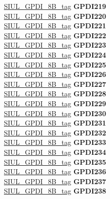 \begin{DoxyCompactItemize}
\begin{tabbing}
\>\>\mbox{\hyperlink{unionSIUL__GPDI__8B__tag}{SIUL\_GPDI\_8B\_tag}} {\bfseries GPDI219}\\
\>\>\mbox{\hyperlink{unionSIUL__GPDI__8B__tag}{SIUL\_GPDI\_8B\_tag}} {\bfseries GPDI220}\\
\>\>\mbox{\hyperlink{unionSIUL__GPDI__8B__tag}{SIUL\_GPDI\_8B\_tag}} {\bfseries GPDI221}\\
\>\>\mbox{\hyperlink{unionSIUL__GPDI__8B__tag}{SIUL\_GPDI\_8B\_tag}} {\bfseries GPDI222}\\
\>\>\mbox{\hyperlink{unionSIUL__GPDI__8B__tag}{SIUL\_GPDI\_8B\_tag}} {\bfseries GPDI223}\\
\>\>\mbox{\hyperlink{unionSIUL__GPDI__8B__tag}{SIUL\_GPDI\_8B\_tag}} {\bfseries GPDI224}\\
\>\>\mbox{\hyperlink{unionSIUL__GPDI__8B__tag}{SIUL\_GPDI\_8B\_tag}} {\bfseries GPDI225}\\
\>\>\mbox{\hyperlink{unionSIUL__GPDI__8B__tag}{SIUL\_GPDI\_8B\_tag}} {\bfseries GPDI226}\\
\>\>\mbox{\hyperlink{unionSIUL__GPDI__8B__tag}{SIUL\_GPDI\_8B\_tag}} {\bfseries GPDI227}\\
\>\>\mbox{\hyperlink{unionSIUL__GPDI__8B__tag}{SIUL\_GPDI\_8B\_tag}} {\bfseries GPDI228}\\
\>\>\mbox{\hyperlink{unionSIUL__GPDI__8B__tag}{SIUL\_GPDI\_8B\_tag}} {\bfseries GPDI229}\\
\>\>\mbox{\hyperlink{unionSIUL__GPDI__8B__tag}{SIUL\_GPDI\_8B\_tag}} {\bfseries GPDI230}\\
\>\>\mbox{\hyperlink{unionSIUL__GPDI__8B__tag}{SIUL\_GPDI\_8B\_tag}} {\bfseries GPDI231}\\
\>\>\mbox{\hyperlink{unionSIUL__GPDI__8B__tag}{SIUL\_GPDI\_8B\_tag}} {\bfseries GPDI232}\\
\>\>\mbox{\hyperlink{unionSIUL__GPDI__8B__tag}{SIUL\_GPDI\_8B\_tag}} {\bfseries GPDI233}\\
\>\>\mbox{\hyperlink{unionSIUL__GPDI__8B__tag}{SIUL\_GPDI\_8B\_tag}} {\bfseries GPDI234}\\
\>\>\mbox{\hyperlink{unionSIUL__GPDI__8B__tag}{SIUL\_GPDI\_8B\_tag}} {\bfseries GPDI235}\\
\>\>\mbox{\hyperlink{unionSIUL__GPDI__8B__tag}{SIUL\_GPDI\_8B\_tag}} {\bfseries GPDI236}\\
\>\>\mbox{\hyperlink{unionSIUL__GPDI__8B__tag}{SIUL\_GPDI\_8B\_tag}} {\bfseries GPDI237}\\
\>\>\mbox{\hyperlink{unionSIUL__GPDI__8B__tag}{SIUL\_GPDI\_8B\_tag}} {\bfseries GPDI238}\\

\end{tabbing}
\end{DoxyCompactItemize}
